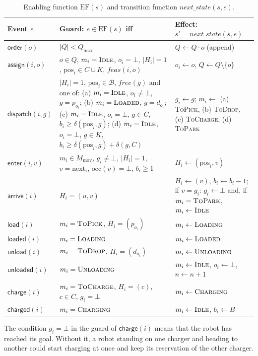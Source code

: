 \documentclass[11pt,a4paper]{article}
\newcommand{\ev}[1]{\mathsf{#1}}            %
\newcommand{\md}[1]{\textsc{#1}}            %
\newcommand{\EF}{\mathrm{EF}}
\newcommand{\occ}{\mathrm{occ}}
\newcommand{\pos}{\mathrm{pos}}
\newcommand{\nxt}{\mathrm{next}}
\newcommand{\Bf}{\mathcal{B}}
\newcommand{\nil}{\bot}
\begin{document}
\begin{table}[H]
\centering\small
\begin{tabularx}{\textwidth}{@{}p{2.3cm} X X@{}}
\toprule
Event $e$ & Guard: $e\in\EF(s)$ iff & Effect: $s'=\mathit{next\_state}(s,e)$\\
\midrule
$\ev{order}(o)$ & $|Q|<Q_{\max}$ & $Q \leftarrow Q\cdot o$ (append) \\
$\ev{assign}(i,o)$ & $o\in Q$, $m_i=\md{Idle}$, $o_i=\nil$, $|H_i|=1$, $\pos_i\in C\cup K$, $\mathit{feas}(i,o)$ & $o_i\leftarrow o$, $Q\leftarrow Q\setminus\{o\}$ \\
$\ev{dispatch}(i,g)$ & $|H_i|=1$, $\pos_i\in\Bf$, $\mathit{free}(g)$ and one of:
  (a) $m_i=\md{Idle}$, $o_i\neq\nil$, $g=p_{o_i}$;
  (b) $m_i=\md{Loaded}$, $g=d_{o_i}$;
  (c) $m_i=\md{Idle}$, $o_i=\nil$, $g\in C$, $b_i\ge\delta(\pos_i,g)$;
  (d) $m_i=\md{Idle}$, $o_i=\nil$, $g\in K$, $b_i\ge\delta(\pos_i,g)+\delta(g,C)$
  & $g_i\leftarrow g$; $m_i\leftarrow$ (a) \md{ToPick}, (b) \md{ToDrop}, (c) \md{ToCharge}, (d) \md{ToPark} \\
$\ev{enter}(i,v)$ & $m_i\in M_{\mathrm{mov}}$, $g_i\neq\nil$, $|H_i|=1$, $v=\nxt_i$, $\occ(v)=\nil$, $b_i\ge 1$ & $H_i\leftarrow(\pos_i,v)$ \\
$\ev{arrive}(i)$ & $H_i=(u,v)$ & $H_i\leftarrow(v)$, $b_i\leftarrow b_i-1$; if $v=g_i$: $g_i\leftarrow\nil$ and, if $m_i=\md{ToPark}$, $m_i\leftarrow\md{Idle}$ \\
$\ev{load}(i)$ & $m_i=\md{ToPick}$, $H_i=(p_{o_i})$ & $m_i\leftarrow\md{Loading}$ \\
$\ev{loaded}(i)$ & $m_i=\md{Loading}$ & $m_i\leftarrow\md{Loaded}$ \\
$\ev{unload}(i)$ & $m_i=\md{ToDrop}$, $H_i=(d_{o_i})$ & $m_i\leftarrow\md{Unloading}$ \\
$\ev{unloaded}(i)$ & $m_i=\md{Unloading}$ & $m_i\leftarrow\md{Idle}$, $o_i\leftarrow\nil$, $n\leftarrow n+1$ \\
$\ev{charge}(i)$ & $m_i=\md{ToCharge}$, $H_i=(c)$, $c\in C$, $g_i=\nil$ & $m_i\leftarrow\md{Charging}$ \\
$\ev{charged}(i)$ & $m_i=\md{Charging}$ & $m_i\leftarrow\md{Idle}$, $b_i\leftarrow B$ \\
\bottomrule
\end{tabularx}
\caption{Enabling function $\EF(s)$ and transition function $\mathit{next\_state}(s,e)$.}
\label{tab:transitions}
\end{table}

The condition $g_i=\nil$ in the guard of $\ev{charge}(i)$ means that the robot
has reached its goal. Without it, a robot standing on one charger and heading
to another could start charging at once and keep its reservation of the other
charger.
\end{document}
